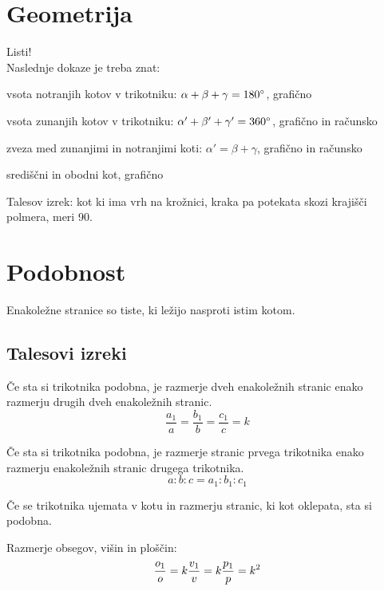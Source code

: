 \documentclass[a4paper,oneside,12pt,fleqn]{article}
\def\deg{\degree}
\numberwithin{equation}{section}
\newenvironment{enumerate*}%
{
\vspace{-12pt}%
\begin{enumerate}%
\setlength{\itemsep}{0pt}%
\setlength{\parskip}{2pt}}%
{\end{enumerate}}
\begin{document}
\section{Geometrija}
\label{sec:geom}
Listi!\\
Naslednje dokaze je treba znat:
\begin{enumerate*}
  \item vsota notranjih kotov v trikotniku: $\alpha + \beta + \gamma = 180\deg$, grafično
  \item vsota zunanjih kotov v trikotniku: $\alpha' + \beta' + \gamma' = 360\deg$, grafično in računsko
  \item zveza med zunanjimi in notranjimi koti: $\alpha' = \beta + \gamma$, grafično in
    računsko \label{enum:geom:notrzun}
  \item središčni in obodni kot, grafično
  \item Talesov izrek: kot ki ima vrh na krožnici, kraka pa potekata skozi krajišči
    polmera, meri 90\deg.
\end{enumerate*}

\section{Podobnost}
\label{sec:podob}
Enakoležne stranice so tiste, ki ležijo nasproti istim kotom.

\subsection{Talesovi izreki}
\label{sec:podob:tales}
Če sta si trikotnika podobna, je razmerje dveh enakoležnih stranic enako razmerju drugih
dveh enakoležnih stranic.
\begin{equation}
  \frac{a_1}{a} = \frac{b_1}{b} = \frac{c_1}{c} = k 
  \label{eq:podob:tal1}
\end{equation}

Če sta si trikotnika podobna, je razmerje stranic prvega trikotnika enako razmerju
enakoležnih stranic drugega trikotnika.
\begin{equation}
  a : b : c = a_1 : b_1 : c_1
  \label{eq:podob:tal2}
\end{equation}

Če se trikotnika ujemata v kotu in razmerju stranic, ki kot oklepata, sta si podobna.

Razmerje obsegov, višin in ploščin:
\[ \frac{o_1}{o} = k  \\
 \frac{v_1}{v} = k  \\
 \frac{p_1}{p} = k^2 \]
\end{document}
